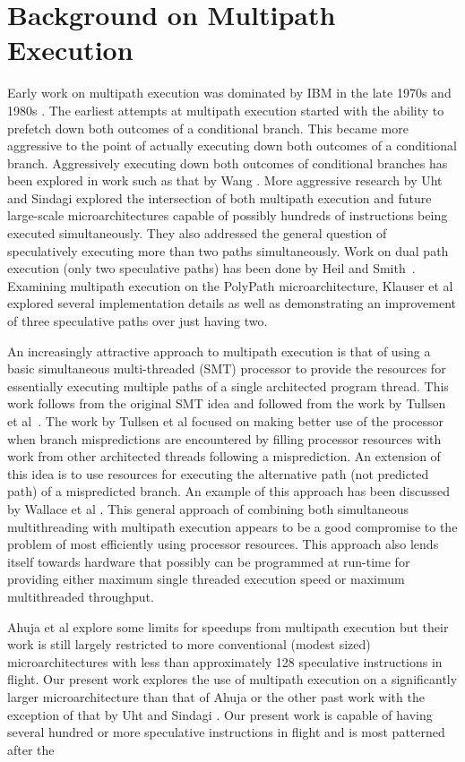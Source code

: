 %
\section{Background on Multipath Execution}
%
Early work on multipath execution was
dominated by IBM in the
late 1970s and 1980s \cite{Conners79}.
The earliest attempts at multipath
execution started with the ability to prefetch down both
outcomes of a conditional branch.  This became more aggressive
to the point of actually executing down both outcomes of
a conditional branch.  Aggressively executing down both outcomes
of conditional branches has been explored in work such as that by
Wang \cite{Wang90}.  
More aggressive research by Uht and
Sindagi \cite{Uht95} explored the intersection of both
multipath execution and future large-scale microarchitectures
capable of possibly hundreds of instructions being executed simultaneously.
They also addressed the general question of speculatively executing
more than two paths simultaneously.
Work on dual path execution (only two speculative paths) has
been done by Heil and Smith~\cite{Heil96}.
Examining multipath execution on the PolyPath microarchitecture,
Klauser et al explored several implementation details
as well as demonstrating an improvement of three speculative paths
over just having two.

An increasingly attractive approach to multipath execution is that
of using a basic simultaneous multi-threaded (SMT) processor
to provide the resources for essentially executing multiple paths
of a single architected program thread.  This work follows from
the original SMT idea and followed from the work by
Tullsen et al~\cite{Tullsen96}.  
The work by Tullsen et al focused
on making better use of the processor when
branch mispredictions are encountered by filling processor resources with
work from other architected threads following a misprediction.
An extension of this idea is to use resources for executing
the alternative path (not predicted path) of a mispredicted branch.
An example of this approach has been discussed by 
Wallace et al \cite{Wallace98}.  This general approach of combining
both simultaneous multithreading with multipath execution appears
to be a good compromise to the problem of most efficiently using
processor resources.  This approach also lends itself towards
hardware that possibly can be programmed at run-time for providing either
maximum single threaded execution speed or maximum multithreaded throughput.

Ahuja et al \cite{Ahuja98} explore some limits for speedups from
multipath execution but their work is still largely restricted to more
conventional (modest sized) microarchitectures with less than approximately
128
speculative instructions in flight.  Our present work explores the use
of multipath execution on a significantly larger microarchitecture than
that of Ahuja or the other past work with the exception of that by
Uht and 
Sindagi \cite{Uht95}.
Our present work is capable of having several hundred or more
speculative instructions in flight and is most patterned after the
